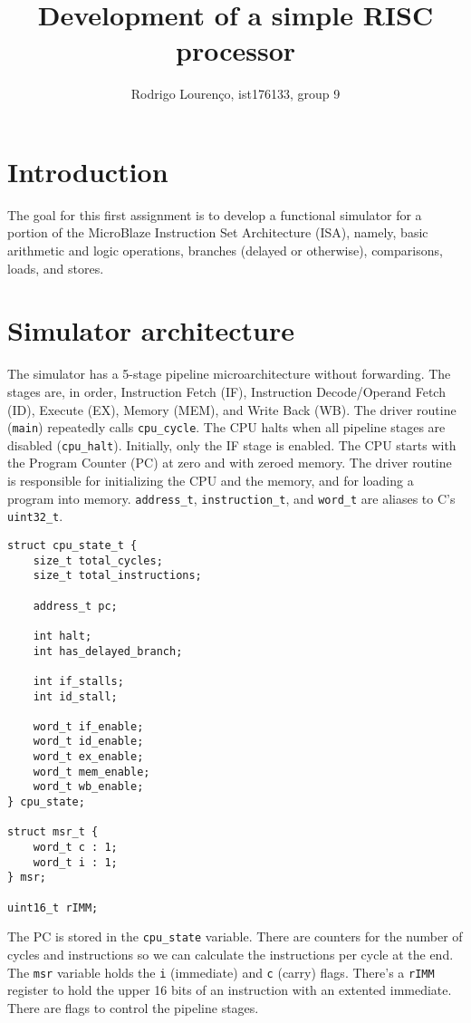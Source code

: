 \documentclass[]{IEEEtran}
\author{Rodrigo Lourenço, ist176133, group 9}
\title{Development of a simple RISC processor}
\begin{document}
\maketitle

\section{Introduction}

The goal for this first assignment is to develop a functional simulator for a
portion of the MicroBlaze Instruction Set Architecture (ISA), namely, basic
arithmetic and logic operations, branches (delayed or otherwise), comparisons,
loads, and stores.

\section{Simulator architecture}

The simulator has a 5-stage pipeline microarchitecture without forwarding. The
stages are, in order, Instruction Fetch (IF), Instruction Decode/Operand Fetch (ID),
Execute (EX), Memory (MEM), and Write Back (WB). The driver routine (\verb|main|)
repeatedly calls \verb|cpu_cycle|. The CPU halts when all pipeline stages are
disabled (\verb|cpu_halt|). Initially, only the IF stage is enabled. The CPU
starts with the Program Counter (PC) at zero and with zeroed memory. The driver
routine is responsible for initializing the CPU and the memory, and for loading
a program into memory. \verb|address_t|, \verb|instruction_t|, and \verb|word_t|
are aliases to C's \verb|uint32_t|.

\begin{verbatim}
struct cpu_state_t {
    size_t total_cycles;
    size_t total_instructions;

    address_t pc;

    int halt;
    int has_delayed_branch;

    int if_stalls;
    int id_stall;

    word_t if_enable;
    word_t id_enable;
    word_t ex_enable;
    word_t mem_enable;
    word_t wb_enable;
} cpu_state;

struct msr_t {
    word_t c : 1;
    word_t i : 1;
} msr;

uint16_t rIMM;
\end{verbatim}

The PC is stored in the \verb|cpu_state| variable. There are counters for
the number of cycles and instructions so we can calculate the instructions per
cycle at the end. The \verb|msr| variable holds the \verb|i| (immediate) and
\verb|c| (carry) flags. There's a \verb|rIMM| register to hold the upper 16 bits
of an instruction with an extented immediate. There are flags to control the
pipeline stages.
\end{document}
